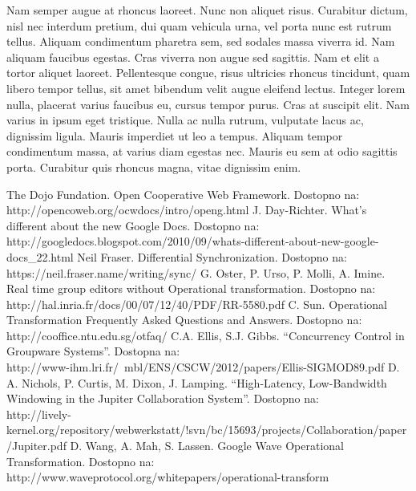\documentclass[a4paper, 12pt, twoside]{book}
\begin{document}
Nam semper augue at rhoncus laoreet. Nunc non aliquet risus. Curabitur dictum, nisl nec interdum pretium, dui quam vehicula urna, vel porta nunc est rutrum tellus. Aliquam condimentum pharetra sem, sed sodales massa viverra id. Nam aliquam faucibus egestas. Cras viverra non augue sed sagittis. Nam et elit a tortor aliquet laoreet. Pellentesque congue, risus ultricies rhoncus tincidunt, quam libero tempor tellus, sit amet bibendum velit augue eleifend lectus. Integer lorem nulla, placerat varius faucibus eu, cursus tempor purus. Cras at suscipit elit. Nam varius in ipsum eget tristique. Nulla ac nulla rutrum, vulputate lacus ac, dignissim ligula. Mauris imperdiet ut leo a tempus. Aliquam tempor condimentum massa, at varius diam egestas nec. Mauris eu sem at odio sagittis porta. Curabitur quis rhoncus magna, vitae dignissim enim.

\begin{thebibliography}{99}
 The Dojo Fundation. Open Cooperative Web Framework. Dostopno na:\\ http://opencoweb.org/ocwdocs/intro/openg.html
 J. Day-Richter. What’s different about the new Google Docs. Dostopno na:\\ http://googledocs.blogspot.com/2010/09/whats-different-about-new-google-docs\_22.html
 Neil Fraser. Differential Synchronization. Dostopno na:\\ https://neil.fraser.name/writing/sync/
 G. Oster, P. Urso, P. Molli, A. Imine. Real time group editors without Operational transformation. Dostopno na:\\ http://hal.inria.fr/docs/00/07/12/40/PDF/RR-5580.pdf
 C. Sun. Operational Transformation Frequently Asked Questions and Answers. Dostopno na:\\ http://cooffice.ntu.edu.sg/otfaq/
 C.A. Ellis, S.J. Gibbs. “Concurrency Control in Groupware Systems”. Dostopna na:\\ http://www-ihm.lri.fr/~mbl/ENS/CSCW/2012/papers/Ellis-SIGMOD89.pdf
 D. A. Nichols, P. Curtis, M. Dixon, J. Lamping. “High-Latency, Low-Bandwidth Windowing in the Jupiter Collaboration System”. Dostopno na:\\ http://lively-kernel.org/repository/webwerkstatt/!svn/bc/15693/projects/Collaboration/paper/Jupiter.pdf
 D. Wang, A. Mah, S. Lassen. Google Wave Operational Transformation. Dostopno na:\\ http://www.waveprotocol.org/whitepapers/operational-transform
\end{thebibliography}

\end{document}
